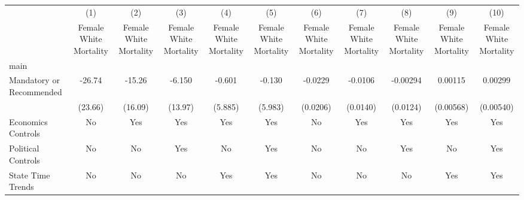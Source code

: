 {
\def\sym#1{\ifmmode^{#1}\else\(^{#1}\)\fi}
\begin{longtable}{l*{10}{c}}
\hline\hline\endfirsthead\hline\endhead\hline\endfoot\endlastfoot
                    &\multicolumn{1}{c}{(1)}&\multicolumn{1}{c}{(2)}&\multicolumn{1}{c}{(3)}&\multicolumn{1}{c}{(4)}&\multicolumn{1}{c}{(5)}&\multicolumn{1}{c}{(6)}&\multicolumn{1}{c}{(7)}&\multicolumn{1}{c}{(8)}&\multicolumn{1}{c}{(9)}&\multicolumn{1}{c}{(10)}\\
                    &\multicolumn{1}{c}{Female White Mortality}&\multicolumn{1}{c}{Female White Mortality}&\multicolumn{1}{c}{Female White Mortality}&\multicolumn{1}{c}{Female White Mortality}&\multicolumn{1}{c}{Female White Mortality}&\multicolumn{1}{c}{Female White Mortality}&\multicolumn{1}{c}{Female White Mortality}&\multicolumn{1}{c}{Female White Mortality}&\multicolumn{1}{c}{Female White Mortality}&\multicolumn{1}{c}{Female White Mortality}\\
\hline
main                &                     &                     &                     &                     &                     &                     &                     &                     &                     &                     \\
Mandatory or Recommended&      -26.74         &      -15.26         &      -6.150         &      -0.601         &      -0.130         &     -0.0229         &     -0.0106         &    -0.00294         &     0.00115         &     0.00299         \\
                    &     (23.66)         &     (16.09)         &     (13.97)         &     (5.885)         &     (5.983)         &    (0.0206)         &    (0.0140)         &    (0.0124)         &   (0.00568)         &   (0.00540)         \\
[1em]
Economics Controls  &          No         &         Yes         &         Yes         &         Yes         &         Yes         &          No         &         Yes         &         Yes         &         Yes         &         Yes         \\
[1em]
Political Controls  &          No         &          No         &         Yes         &          No         &         Yes         &          No         &          No         &         Yes         &          No         &         Yes         \\
[1em]
State Time Trends   &          No         &          No         &          No         &         Yes         &         Yes         &          No         &          No         &          No         &         Yes         &         Yes         \\

\end{longtable}}
